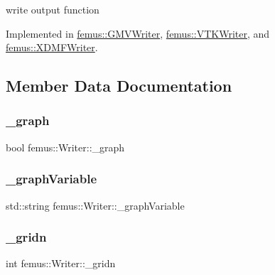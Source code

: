 write output function 

Implemented in \mbox{\hyperlink{classfemus_1_1_g_m_v_writer_a9f485fb5f1985f07615aed89c18fd254}{femus\+::\+G\+M\+V\+Writer}}, \mbox{\hyperlink{classfemus_1_1_v_t_k_writer_a91486b781799b8721f4a3a4099392be5}{femus\+::\+V\+T\+K\+Writer}}, and \mbox{\hyperlink{classfemus_1_1_x_d_m_f_writer_a01b6d71015768b64cff7adbc98a1ec8f}{femus\+::\+X\+D\+M\+F\+Writer}}.



\subsection{Member Data Documentation}
\mbox{\label{classfemus_1_1_writer_a51798fe762bd3fe7f03de89fcd689c9f}} 
\subsubsection{\texorpdfstring{\+\_\+graph}{\_graph}}
{\footnotesize\ttfamily bool femus\+::\+Writer\+::\+\_\+graph\hspace{0.3cm}{\ttfamily [protected]}}

\mbox{\label{classfemus_1_1_writer_abc4c8bb583c18bd90d006d01fcb448a1}} 
\subsubsection{\texorpdfstring{\+\_\+graph\+Variable}{\_graphVariable}}
{\footnotesize\ttfamily std\+::string femus\+::\+Writer\+::\+\_\+graph\+Variable\hspace{0.3cm}{\ttfamily [protected]}}

\mbox{\label{classfemus_1_1_writer_ad9e4841295416233d0943775111fc1d3}} 
\subsubsection{\texorpdfstring{\+\_\+gridn}{\_gridn}}
{\footnotesize\ttfamily int femus\+::\+Writer\+::\+\_\+gridn\hspace{0.3cm}{\ttfamily [protected]}}

